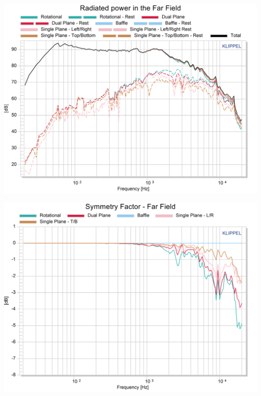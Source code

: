 \documentclass{report}
\begin{document}
\begin{minipage}{0.5\textwidth}
\begin{center}
	\includegraphics[width=\textwidth]{Sym/Rad_Pow_OvalSpkr} 
    \captionsetup{hypcap=false} 
	\label{fig:rad_pow_Oval}
\end{center}
\end{minipage}
\begin{minipage}{0.5\textwidth}
\begin{center}
	\includegraphics[width=\textwidth]{Sym/Sym_Fact_OvalSpkr} 
    \captionsetup{hypcap=false} 
	\label{fig:sym_fact_Oval}
\end{center}
\end{minipage}
\vspace{0.1cm}
\end{document}
